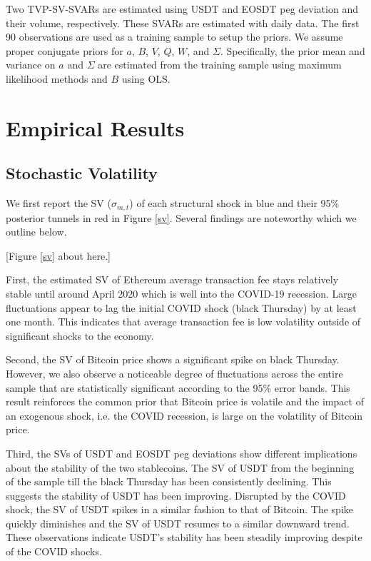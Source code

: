 \documentclass[12pt]{article}
\begin{document}
 
 Two TVP-SV-SVARs are estimated using USDT and EOSDT peg deviation and their volume, respectively. These SVARs are estimated with daily data. The first 90 observations are used as a training sample to setup the priors. We assume proper conjugate priors for $a$, $B$, $V$, $Q$, $W$, and $\Sigma$. Specifically, the prior mean and variance on $a$ and $\Sigma$ are estimated from the training sample using maximum likelihood methods and $B$ using OLS. 



\section{Empirical Results}
\subsection{Stochastic Volatility}
We first report the SV ($\sigma_{m,t}$) of each structural shock in blue and their 95\% posterior tunnels in red in Figure \ref{sv}. Several findings are noteworthy which we outline below.

\begin{center}
[Figure \ref{sv} about here.]
\end{center}



First, the estimated SV of Ethereum average transaction fee stays relatively stable until around April 2020 which is well into the COVID-19 recession. Large fluctuations appear to lag the initial COVID shock (black Thursday) by at least one month. This indicates that average transaction fee is low volatility outside of significant shocks to the economy. 

Second, the SV of Bitcoin price shows a significant spike on black Thursday. However, we also observe a noticeable degree of fluctuations across the entire sample that are statistically significant according to the 95\% error bands. This result reinforces the common prior that Bitcoin price is volatile and the impact of an exogenous shock, i.e. the COVID recession, is large on the volatility of Bitcoin price.

Third, the SVs of USDT and EOSDT peg deviations show different implications about the stability of the two stablecoins. The SV of USDT from the beginning of the sample till the black Thursday has been consistently declining. This suggests the stability of USDT has been improving. Disrupted by the COVID shock, the SV of USDT spikes in a similar fashion to that of Bitcoin. The spike quickly diminishes and the SV of USDT resumes to a similar downward trend. These observations indicate USDT's stability has been steadily improving despite of the COVID shocks. 
\end{document}
